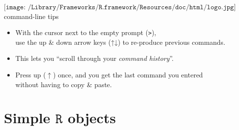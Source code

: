 \documentclass[
  11pt,
  ignorenonframetext,
]{beamer}
\newcommand{\AlertTok}[1]{\textcolor[rgb]{0.94,0.16,0.16}{#1}}
\newcommand{\OtherTok}[1]{\textcolor[rgb]{0.56,0.35,0.01}{#1}}
\begin{document}
\begin{frame}{\(\texttt{[image: /Library/Frameworks/R.framework/Resources/doc/html/logo.jpg]}\)
command-line tips}
\protect\hypertarget{includegraphicsheight1emlibraryframeworksr.frameworkresourcesdochtmllogo.jpg-command-line-tips}{}
\begin{itemize}
\item
  With the cursor next to the empty prompt (\OtherTok{\texttt{>}}),\\
  use the up \& down \AlertTok{arrow keys} (↑↓) to re-produce previous
  commands.
\item
  This lets you ``scroll through your \emph{command history}''.
\item
  Press \AlertTok{up} (\AlertTok{$\uparrow$}) once, and you get the last
  command you entered\\
  without having to copy \& paste.
\end{itemize}
\end{frame}

\hypertarget{simple-textttr-objects}{%
\section{\texorpdfstring{Simple \(\texttt{R}\)
objects}{Simple \textbackslash texttt\{R\} objects}}\label{simple-textttr-objects}}
\end{document}
